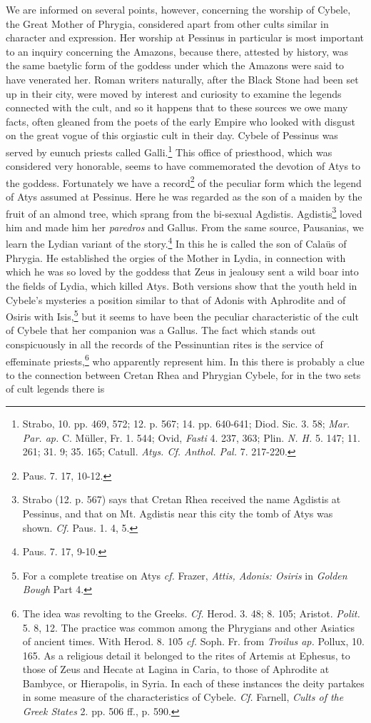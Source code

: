 \documentclass[a4paper, 12pt, oneside]{article}
\begin{document}
We are informed on several points, however, concerning the worship of Cybele, the Great Mother of Phrygia, considered apart from other cults similar in character and expression. Her worship at Pessinus in particular is most important to an inquiry concerning the Amazons, because there, attested by history, was the same baetylic form of the goddess under which the Amazons were said to have venerated her. Roman writers naturally, after the Black Stone had been set up in their city, were moved by interest and curiosity to examine the legends connected with the cult, and so it happens that to these sources we owe many facts, often gleaned from the poets of the early Empire who looked with disgust on the great vogue of this orgiastic cult in their day. Cybele of Pessinus was served by eunuch priests called Galli.\footnote{Strabo, 10. pp. 469, 572; 12. p. 567; 14. pp. 640-641; Diod. Sic. 3. 58; \emph{Mar. Par. ap.} C. Müller, Fr. 1. 544; Ovid, \emph{Fasti} 4. 237, 363; Plin. \emph{N. H.} 5. 147; 11. 261; 31. 9; 35. 165; Catull. \emph{Atys. Cf. Anthol. Pal.} 7. 217-220.} This office of priesthood, which was considered very honorable, seems to have commemorated the devotion of Atys to the goddess. Fortunately we have a record\footnote{Paus. 7. 17, 10-12.} of the peculiar form which the legend of Atys assumed at Pessinus. Here he was regarded as the son of a maiden by the fruit of an almond tree, which sprang from the bi-sexual Agdistis. Agdistis\footnote{Strabo (12. p. 567) says that Cretan Rhea received the name Agdistis at Pessinus, and that on Mt. Agdistis near this city the tomb of Atys was shown. \emph{Cf.} Paus. 1. 4, 5.} loved him and made him her \emph{paredros} and Gallus. From the same source, Pausanias, we learn the Lydian variant of the story.\footnote{Paus. 7. 17, 9-10.} In this he is called the son of Calaüs of Phrygia. He established the orgies of the Mother in Lydia, in connection with which he was so loved by the goddess that Zeus in jealousy sent a wild boar into the fields of Lydia, which killed Atys. Both versions show that the youth held in Cybele's mysteries a position similar to that of Adonis with Aphrodite and of Osiris with Isis,\footnote{For a complete treatise on Atys \emph{cf.} Frazer, \emph{Attis, Adonis: Osiris} in \emph{Golden Bough} Part 4.} but it seems to have been the peculiar characteristic of the cult of Cybele that her companion was a Gallus. The fact which stands out conspicuously in all the records of the Pessinuntian rites is the service of effeminate priests,\footnote{The idea was revolting to the Greeks. \emph{Cf.} Herod. 3. 48; 8. 105; Aristot. \emph{Polit.} 5. 8, 12. The practice was common among the Phrygians and other Asiatics of ancient times. With Herod. 8. 105 \emph{cf.} Soph. Fr. from \emph{Troilus ap.} Pollux, 10. 165. As a religious detail it belonged to the rites of Artemis at Ephesus, to those of Zeus and Hecate at Lagina in Caria, to those of Aphrodite at Bambyce, or Hierapolis, in Syria. In each of these instances the deity partakes in some measure of the characteristics of Cybele. \emph{Cf.} Farnell, \emph{Cults of the Greek States} 2. pp. 506 ff., p. 590.} who apparently represent him. In this there is probably a clue to the connection between Cretan Rhea and Phrygian Cybele, for in the two sets of cult legends there is 
\end{document}
